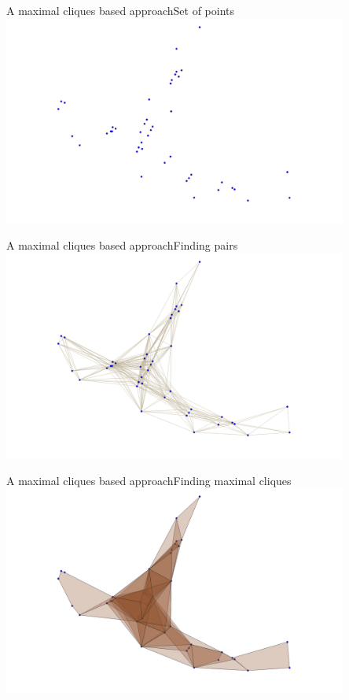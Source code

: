\documentclass{beamer}
\begin{document}
\begin{frame}{A maximal cliques based approach}{Set of points}
    \centering
    \includegraphics[width=0.85\textwidth]{figures/demo1}
\end{frame}
\begin{frame}{A maximal cliques based approach}{Finding pairs}
    \centering
    \includegraphics[width=0.85\textwidth]{figures/demo2}
\end{frame}
\begin{frame}{A maximal cliques based approach}{Finding maximal cliques}
    \centering
    \includegraphics[width=0.85\textwidth]{figures/demo3}
\end{frame}
\end{document}
